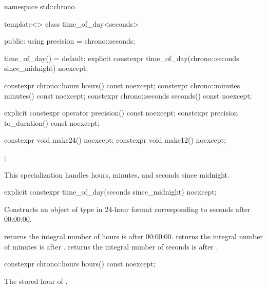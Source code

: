\begin{codeblock}
namespace std::chrono {
  template<>
  class time_of_day<seconds> {
  public:
    using precision = chrono::seconds;

    time_of_day() = default;
    explicit constexpr time_of_day(chrono::seconds since_midnight) noexcept;

    constexpr chrono::hours   hours()   const noexcept;
    constexpr chrono::minutes minutes() const noexcept;
    constexpr chrono::seconds seconds() const noexcept;

    explicit constexpr operator  precision()   const noexcept;
    constexpr          precision to_duration() const noexcept;

    constexpr void make24() noexcept;
    constexpr void make12() noexcept;
  };
}
\end{codeblock}

\pnum
\begin{note}
This specialization handles hours, minutes, and seconds since midnight.
\end{note}

%
\begin{itemdecl}
explicit constexpr time_of_day(seconds since_midnight) noexcept;
\end{itemdecl}

\begin{itemdescr}
\pnum
\effects
Constructs an object of type 
in 24-hour format
corresponding to  seconds after 00:00:00.

\pnum
\postconditions
{} returns the integral number of hours
 is after 00:00:00.
 returns the integral number of minutes
 is after .
 returns the integral number of seconds
 is after .
\end{itemdescr}

%
\begin{itemdecl}
constexpr chrono::hours hours() const noexcept;
\end{itemdecl}

\begin{itemdescr}
\pnum
\returns
The stored hour of .
\end{itemdescr}


